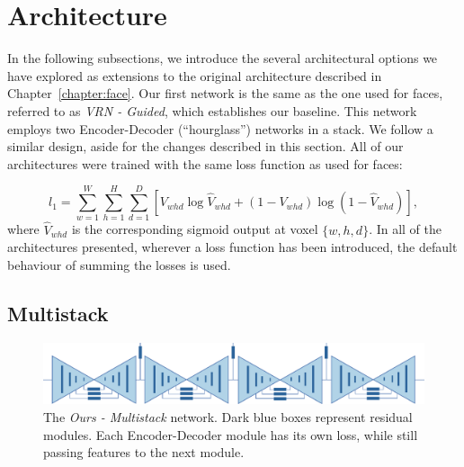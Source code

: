 \section{Architecture}

In the following subsections, we introduce the several architectural
options we have explored as extensions to the original architecture
described in Chapter~\ref{chapter:face}. Our first network is the same
as the one used for faces, referred to as \textit{VRN - Guided}, which
establishes our baseline. This network employs two Encoder-Decoder
(``hourglass'') networks in a stack. We follow a similar design, aside
for the changes described in this section. All of our architectures
were trained with the same loss function as used for faces:

\begin{equation}
  l_{1} = \sum\limits_{w=1}^{W} \sum\limits_{h=1}^{H}\sum\limits_{d=1}^{D}[V_{whd}\log \widehat{V}_{whd}+(1-V_{whd})\log(1-\widehat{V}
_{whd})],
\end{equation}
where $\widehat{V}_{whd}$ is the corresponding sigmoid output at voxel
$\{w,h,d\}$. In all of the architectures presented, wherever a loss
function has been introduced, the default behaviour of summing the
losses is used.

\subsection{Multistack}

\begin{figure}
  \includegraphics[width=\linewidth]{img/multistack.pdf}
  \caption[Proposed stacked architecture]{The \textit{Ours -
      Multistack} network. Dark blue boxes represent residual
    modules. Each Encoder-Decoder module has its own loss, while still
    passing features to the next module.}
  \label{fig:multistack}
\end{figure}


